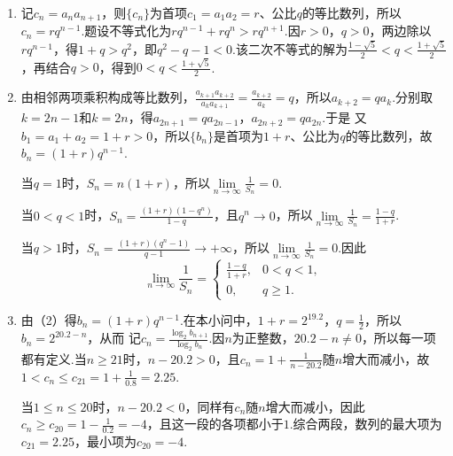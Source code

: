 \begin{solution}
\begin{enumerate}
\item 记\(c_n=a_na_{n+1}\)，则\(\{c_n\}\)为首项\(c_1=a_1a_2=r\)、公比\(q\)的等比数列，所以\(c_n=rq^{n-1}\).题设不等式化为\(rq^{n-1}+rq^n>rq^{n+1}\).因\(r>0\)，\(q>0\)，两边除以\(rq^{n-1}\)，得\(1+q>q^2\)，即\(q^2-q-1<0\).该二次不等式的解为\(\frac{1-\sqrt5}{2}<q<\frac{1+\sqrt5}{2}\)，再结合\(q>0\)，得到\(0<q<\frac{1+\sqrt5}{2}\).

\item 由相邻两项乘积构成等比数列，\(\frac{a_{k+1}a_{k+2}}{a_ka_{k+1}}=\frac{a_{k+2}}{a_k}=q\)，所以\(a_{k+2}=qa_k\).分别取\(k=2n-1\)和\(k=2n\)，得\(a_{2n+1}=qa_{2n-1}\)，\(a_{2n+2}=qa_{2n}\).于是
又\(b_1=a_1+a_2=1+r>0\)，所以\(\{b_n\}\)是首项为\(1+r\)、公比为\(q\)的等比数列，故\(b_n=(1+r)q^{n-1}\).

当\(q=1\)时，\(S_n=n(1+r)\)，所以\(\lim\limits_{n\to\infty}\frac1{S_n}=0\).

当\(0<q<1\)时，\(S_n=\frac{(1+r)(1-q^n)}{1-q}\)，且\(q^n\to0\)，所以\(\lim\limits_{n\to\infty}\frac1{S_n}=\frac{1-q}{1+r}\).

当\(q>1\)时，\(S_n=\frac{(1+r)(q^n-1)}{q-1}\to+\infty\)，所以\(\lim\limits_{n\to\infty}\frac1{S_n}=0\).因此
\[
\lim\limits_{n \to \infty} \frac{1}{S_n}
=
\begin{cases}
\frac{1 - q}{1 + r}, & 0 < q < 1,\\
0, & q \geqslant 1.
\end{cases}
\]

\item 由（2）得\(b_n=(1+r)q^{n-1}\).在本小问中，\(1+r=2^{19.2}\)，\(q=\frac12\)，所以\(b_n=2^{20.2-n}\)，从而
记\(c_n=\frac{\log_2b_{n+1}}{\log_2b_n}\).因\(n\)为正整数，\(20.2-n\ne0\)，所以每一项都有定义.当\(n\geqslant21\)时，\(n-20.2>0\)，且\(c_n=1+\frac1{n-20.2}\)随\(n\)增大而减小，故\(1<c_n\leqslant c_{21}=1+\frac1{0.8}=2.25\).

当\(1\leqslant n\leqslant20\)时，\(n-20.2<0\)，同样有\(c_n\)随\(n\)增大而减小，因此\(c_n\geqslant c_{20}=1-\frac1{0.2}=-4\)，且这一段的各项都小于\(1\).综合两段，数列的最大项为\(c_{21}=2.25\)，最小项为\(c_{20}=-4\).
\end{enumerate}
\end{solution}
